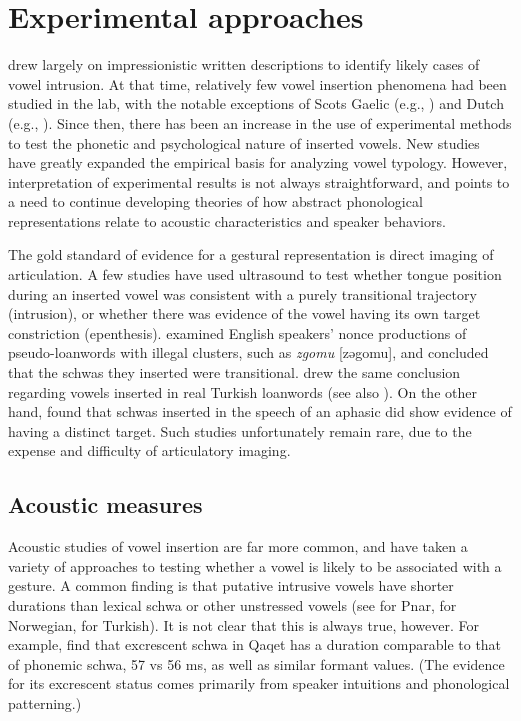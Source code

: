 \documentclass[output=paper,colorlinks,citecolor=brown]{langscibook}
\begin{document}
\section{Experimental approaches} \label{sec3}
\citet{Hall:2003, Hall2006} drew largely on impressionistic written descriptions to identify likely cases of vowel intrusion. At that time, relatively few vowel insertion phenomena had been studied in the lab, with the notable exceptions of Scots Gaelic (e.g., \cite{ladefoged1998phonetic, bosch1997prosody}) and Dutch (e.g., \cite{van1999facilitatory, warner2001phonological}). Since then, there has been an increase in the use of experimental methods to test the phonetic and psychological nature of inserted vowels. New studies have greatly expanded the empirical basis for analyzing vowel typology. However, interpretation of experimental results is not always straightforward, and points to a need to continue developing theories of how abstract phonological representations relate to acoustic characteristics and speaker behaviors. 

The gold standard of evidence for a gestural representation is direct imaging of articulation. A few studies have used ultrasound to test whether tongue position during an inserted vowel was consistent with a purely transitional trajectory (intrusion), or whether there was evidence of the vowel having its own target constriction (epenthesis). \citet{DavidsonStone2003} examined English speakers’ nonce productions of pseudo-loanwords with illegal clusters, such as \textit{zgomu} [zəgomu], and concluded that the schwas they inserted were transitional. \citet{Bellik2019a} drew the same conclusion regarding vowels inserted in real Turkish loanwords (see also ). On the other hand, \citet{buchwald2006evidence} found that schwas inserted in the speech of an aphasic did show evidence of having a distinct target. Such studies unfortunately remain rare, due to the expense and difficulty of articulatory imaging. 

\subsection{Acoustic measures} \label{sec3_1}
Acoustic studies of vowel insertion are far more common, and have taken a variety of approaches to testing whether a vowel is likely to be associated with a gesture. A common finding is that putative intrusive vowels have shorter durations than lexical schwa or other unstressed vowels (see \cite{ring2014intrusive} for Pnar, \cite{garmann2021cross} for Norwegian, \cite{Bellik2019a} for Turkish). It is not clear that this is always true, however. For example, \citet[14]{tabain2022qaqet} find that excrescent schwa in Qaqet has a duration comparable to that of phonemic schwa, 57 vs 56 ms, as well as similar formant values. (The evidence for its excrescent status comes primarily from speaker intuitions and phonological patterning.) 
\end{document}
